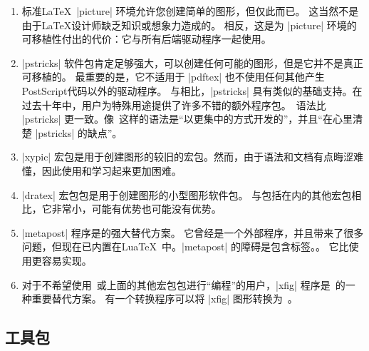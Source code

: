 \begin{enumerate}
    \item 标准\LaTeX\ |{picture}| 环境允许您创建简单的图形，但仅此而已。 这当然不是由于\LaTeX 设计师缺乏知识或想象力造成的。 相反，这是为 |{picture}| 环境的可移植性付出的代价：它与所有后端驱动程序一起使用。
    \item |pstricks| 软件包肯定足够强大，可以创建任何可能的图形，但是它并不是真正可移植的。 最重要的是，它不适用于 |pdftex| 也不使用任何其他产生PostScript代码以外的驱动程序。
    与\tikzname 相比，|pstricks| 具有类似的基础支持。在过去十年中，用户为特殊用途提供了许多不错的额外程序包。\tikzname\ 语法比 |pstricks| 更一致。像\tikzname\ 这样的语法是“以更集中的方式开发的”，并且“在心里清楚 |pstricks| 的缺点”。
    \item |xypic| 宏包是用于创建图形的较旧的宏包。然而，由于语法和文档有点晦涩难懂，因此使用和学习起来更加困难。
    \item |dratex| 宏包包是用于创建图形的小型图形软件包。 与包括\tikzname 在内的其他宏包相比，它非常小，可能有优势也可能没有优势。
    \item |metapost| 程序是\tikzname 的强大替代方案。 它曾经是一个外部程序，并且带来了很多问题，但现在已内置在Lua\TeX\ 中。|metapost| 的障碍是包含标签。。 它比使用\pgfname 更容易实现。
    \item 对于不希望使用\tikzname\ 或上面的其他宏包包进行``编程''的用户，|xfig| 程序是\tikzname\ 的一种重要替代方案。 有一个转换程序可以将 |xfig| 图形转换为\tikzname\ 。
\end{enumerate}

\subsection{工具包}


